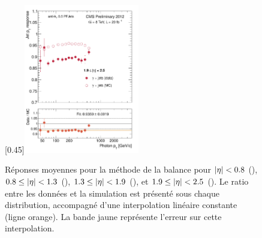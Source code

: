 \begin{figure}[p]
    \subcaptionbox{\label{fig:bal_eta1925}}[0.45\textwidth]{\includegraphics[width=0.45\textwidth]{chapitre4/figs/resp_balancing/response_eta1925_balancing.pdf}}
    \caption{Réponses moyennes pour la méthode de la balance pour $\lvert \eta \rvert < \num{0.8}$ (), $\num{0.8} \leq \lvert \eta \rvert < \num{1.3}$ (), $\num{1.3} \leq \lvert \eta \rvert < \num{1.9}$ (), et $\num{1.9} \leq \lvert \eta \rvert < \num{2.5}$ (). Le ratio entre les données et la simulation est présenté sous chaque distribution, accompagné d'une interpolation linéaire constante (ligne orange). La bande jaune représente l'erreur sur cette interpolation.}
    \label{fig:balancing_resp}
\end{figure}



